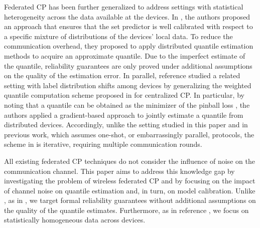 \documentclass[12pt, draftclsnofoot, onecolumn]{IEEEtran}
\begin{document}
Federated CP has been further generalized to address settings with statistical heterogeneity across the data available at the devices. In \cite{lu2023federated}, the authors proposed an approach that ensures that the set predictor is well calibrated with respect to a specific mixture of distributions of the devices' local data. To reduce the communication overhead, they proposed to apply distributed quantile estimation methods \cite{luo2016quantiles, dunning2021t} to acquire an approximate quantile. Due to the imperfect estimate of the quantile, reliability guarantees are only proved under additional assumptions on the quality of the estimation error.
In parallel, reference \cite{plassier2023conformal} studied a related setting with label distribution shifts among devices by generalizing the weighted quantile computation scheme proposed in  \cite{tibshirani2019conformal} for centralized CP.
In particular, by noting that a quantile can be obtained as the minimizer of the pinball loss \cite{plassier2023conformal}, the authors applied a gradient-based approach to jointly estimate a quantile from distributed devices.
Accordingly, unlike the setting studied in this paper and in previous work, which assumes one-shot, or embarrassingly parallel, protocols,  the scheme in \cite{plassier2023conformal} is iterative, requiring multiple communication rounds.

All existing federated CP techniques do not consider the influence of noise on the communication channel. This paper aims to address this knowledge gap by investigating the problem of wireless federated CP and by focusing on the impact of channel noise on quantile estimation and, in turn, on model calibration. Unlike \cite{lu2023federated, plassier2023conformal}, as in \cite{FedCP-QQ}, we target formal reliability guarantees without additional assumptions on the quality of the quantile estimates. Furthermore, as in reference \cite{FedCP-QQ}, we focus on statistically homogeneous data across devices.

\end{document}
